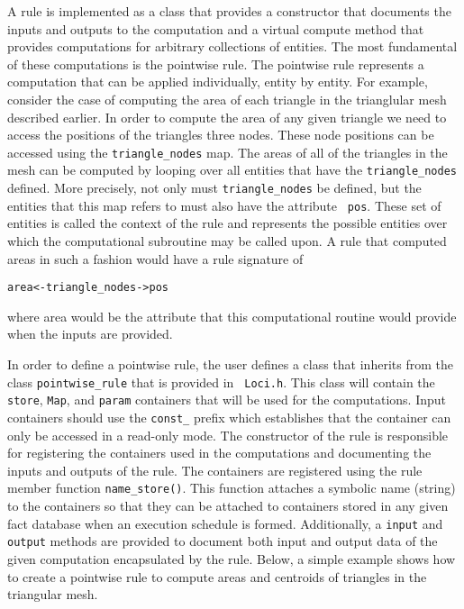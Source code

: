 \documentclass[10pt,epsf]{book}
\begin{document}
A rule is implemented as a class that provides a constructor that
documents the inputs and outputs to the computation and a virtual
compute method that provides computations for arbitrary collections of
entities.  The most fundamental of these computations is the pointwise
rule.  The pointwise rule represents a computation that can be applied
individually, entity by entity.  For example, consider the case of
computing the area of each triangle in the trianglular mesh described
earlier.  In order to compute the area of any given triangle we need
to access the positions of the triangles three nodes.  These node
positions can be accessed using the {\tt triangle\_nodes} map.  The
areas of all of the triangles in the mesh can be computed by looping
over all entities that have the {\tt triangle\_nodes} defined.  More
precisely, not only must {\tt triangle\_nodes} be defined, but the
entities that this map refers to must also have the attribute {\tt
  pos}.  These set of entities is called the context of the rule and
represents the possible entities over which the computational
subroutine may be called upon.  A rule that computed areas in such a
fashion would have a rule signature of
\begin{verbatim}
area<-triangle_nodes->pos
\end{verbatim}
where area would be the attribute that this computational routine
would provide when the inputs are provided.  

In order to define a pointwise rule, the user defines a class that
inherits from the class {\tt pointwise\_rule} that is provided in {\tt
  Loci.h}.  This class will contain the {\tt store}, {\tt Map}, and
{\tt param} containers that will be used for the computations.  Input
containers should use the {\tt const\_} prefix which establishes that
the container can only be accessed in a read-only mode.  The
constructor of the rule is responsible for registering the containers
used in the computations and documenting the inputs and outputs of the
rule.  The containers are registered using the rule member function
{\tt name\_store()}.  This function attaches a symbolic name (string)
to the containers so that they can be attached to containers stored in
any given fact database when an execution schedule is formed.
Additionally, a {\tt input} and {\tt output} methods are provided to
document both input and output data of the given computation
encapsulated by the rule.  Below, a simple example shows how to create
a pointwise rule to compute areas and centroids of triangles in the
triangular mesh.
\end{document}
